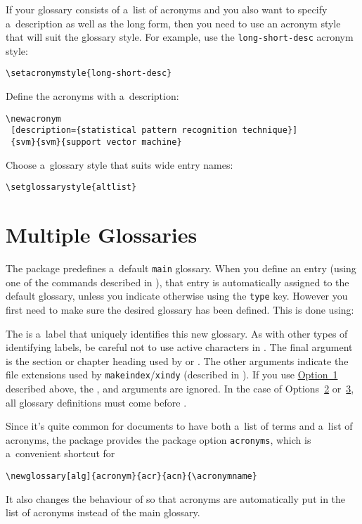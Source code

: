 \documentclass{nlctdoc}
\newcommand*{\opt}[1]{\hyperlink{option#1}{Option~#1}}
\newcommand*{\optsor}[2]{Options~\hyperlink{option#1}{#1}
or~\hyperlink{option#2}{#2}}
\begin{document}
If your glossary consists of a~list of acronyms and you also want to
specify a~description as well as the long form, then you need to use
an acronym style that will suit the glossary style. For example,
use the \texttt{long-short-desc} acronym style:
\begin{verbatim}
\setacronymstyle{long-short-desc}
\end{verbatim}
Define the acronyms with a~description:
\begin{verbatim}
\newacronym
 [description={statistical pattern recognition technique}]
 {svm}{svm}{support vector machine}
\end{verbatim}
Choose a~glossary style that suits wide entry names:
\begin{verbatim}
\setglossarystyle{altlist}
\end{verbatim}

\section{Multiple Glossaries}
\label{sec:multigloss}

The  package predefines a~default \texttt{main}
glossary. When you define an entry (using one of the commands
described in ), that entry is automatically
assigned to the default glossary, unless you indicate otherwise 
using the \texttt{type} key. However you first need to
make sure the desired glossary has been defined. This is done using:
\begin{definition}
\end{definition}
The  is a~label that uniquely identifies this new
glossary. As with other types of identifying labels, be careful not
to use active characters in . The final argument
 is the section or chapter heading used by
 or . The other arguments
indicate the file extensions used by
\texttt{makeindex}\slash\texttt{xindy} (described in
). If you use \opt1 described
above, the ,  and  arguments are
ignored. In the case of \optsor23, all glossary definitions must come before
.

Since it's quite common for documents to have both a~list of terms
and a~list of acronyms, the  package provides the
package option \texttt{acronyms}, which is a~convenient shortcut for
\begin{verbatim}
\newglossary[alg]{acronym}{acr}{acn}{\acronymname}
\end{verbatim}
It also changes the behaviour of  so that acronyms
are automatically put in the list of acronyms instead of the main
glossary.
\end{document}
